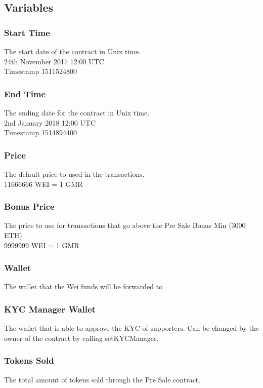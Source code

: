 \documentclass[11pt]{article} %
\begin{document}
\subsection{Variables}

\subsubsection{Start Time}
The start date of the contract in Unix time. \\
24th November 2017 12:00 UTC\\
Timestamp 1511524800 

\subsubsection{End Time}
The ending date for the contract in Unix time.\\
2nd January 2018 12:00 UTC\\
Timestamp 1514894400 

\subsubsection{Price}
The default price to used in the transactions.\\
11666666 WEI = 1 GMR

\subsubsection{Bonus Price}
The price to use for transactions that go above the Pre Sale Bonus Min (3000 ETH)\\
9999999 WEI = 1 GMR

\subsubsection{Wallet}
The wallet that the Wei funds will be forwarded to

\subsubsection{KYC Manager Wallet}
The wallet that is able to approve the KYC of supporters. 
Can be changed by the owner of the contract by calling setKYCManager.

\subsubsection{Tokens Sold}
The total amount of tokens sold through the Pre Sale contract.
\end{document}
